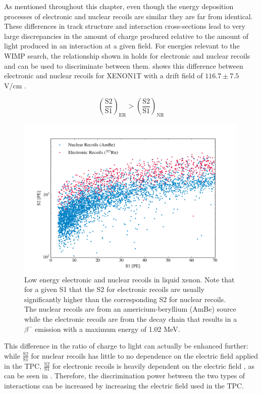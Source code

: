 As mentioned throughout this chapter, even though the energy deposition processes of electronic and nuclear recoils are similar they are far from identical.  These differences in track structure and interaction cross-sections lead to very large discrepancies in the amount of charge produced relative to the amount of light produced in an interaction at a given field.   For energies relevant to the WIMP search, the relationship shown in  holds for electronic and nuclear recoils and can be used to discriminate between them.   shows this difference between electronic and nuclear recoils for XENON1T with a drift field of $116.7 \pm 7.5$ V/cm \cite{aprile2017first}.

\begin{equation}
        \label{eqn:lxe_disc}
        \left( \frac{\textrm{S2}}{\textrm{S1}} \right)_{\textrm{ER}} > \left( \frac{\textrm{S2}}{\textrm{S1}} \right)_{\textrm{NR}}
\end{equation}

\begin{figure}[t]
	\centering
	\includegraphics[width=0.99\textwidth]{xe1t_disc}
	\caption{Low energy electronic and nuclear recoils in liquid xenon.  Note that for a given S1 that the S2 for electronic recoils are usually significantly higher than the corresponding S2 for nuclear recoils.  The nuclear recoils are from an americium-beryllium (AmBe) source while the electronic recoils are from the  decay chain that results in a $\beta^-$ emission with a maximum energy of 1.02 MeV.}
	\label{fig:xe1t_disc}
\end{figure}

This difference in the ratio of charge to light can actually be enhanced further: while $\frac{\textrm{S2}}{\textrm{S1}}$ for nuclear recoils has little to no dependence on the electric field applied in the TPC, $\frac{\textrm{S2}}{\textrm{S1}}$ for electronic recoils is heavily dependent on the electric field \cite{aprile2006simultaneous, goetzke2016measurement}, as can be seen in .  Therefore, the discrimination power between the two types of interactions can be increased by increasing the electric field used in the TPC.

